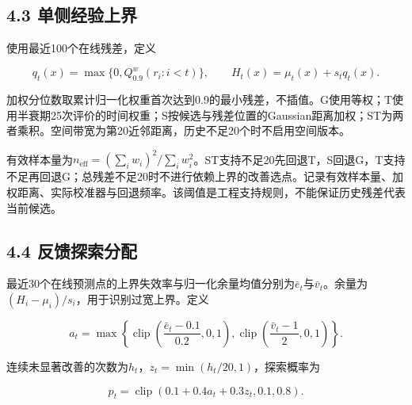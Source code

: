 \documentclass[11pt,a4paper]{article}
\begin{document}
\par{}\noindent\begin{minipage}{\linewidth}

\hypertarget{ux5355ux4fa7ux7ecfux9a8cux4e0aux754c}{%
\subsection{4.3
单侧经验上界}\label{ux5355ux4fa7ux7ecfux9a8cux4e0aux754c}}

使用最近100个在线残差，定义

\[
q_t(x)=\max\{0,Q^w_{0.9}(r_i:i<t)\},\qquad H_t(x)=\mu_t(x)+s_tq_t(x).
\]

\end{minipage}\par

加权分位数取累计归一化权重首次达到0.9的最小残差，不插值。G使用等权；T使用半衰期25次评价的时间权重；S按候选与残差位置的Gaussian距离加权；ST为两者乘积。空间带宽为第20近邻距离，历史不足20个时不启用空间版本。

有效样本量为\(n_{\mathrm{eff}}=(\sum_i w_i)^2/\sum_i w_i^2\)。ST支持不足20先回退T，S回退G，T支持不足再回退G；总残差不足20时不进行依赖上界的改善选点。记录有效样本量、加权距离、实际校准器与回退频率。该阈值是工程支持规则，不能保证历史残差代表当前候选。

\par{}\noindent\begin{minipage}{\linewidth}

\hypertarget{ux53cdux9988ux63a2ux7d22ux5206ux914d}{%
\subsection{4.4
反馈探索分配}\label{ux53cdux9988ux63a2ux7d22ux5206ux914d}}

最近30个在线预测点的上界失效率与归一化余量均值分别为\(\bar e_t\)与\(\bar v_t\)。余量为\((H_i-\mu_i)/s_i\)，用于识别过宽上界。定义

\[
a_t=\max\left\{\operatorname{clip}\left(\frac{\bar e_t-0.1}{0.2},0,1\right),\operatorname{clip}\left(\frac{\bar v_t-1}{2},0,1\right)\right\}.
\]

\end{minipage}\par

\par\noindent\begin{minipage}{\linewidth}

连续未显著改善的次数为\(h_t\)，\(z_t=\min(h_t/20,1)\)，探索概率为

\[
p_t=\operatorname{clip}(0.1+0.4a_t+0.3z_t,0.1,0.8).
\]

\end{minipage}\par
\end{document}
